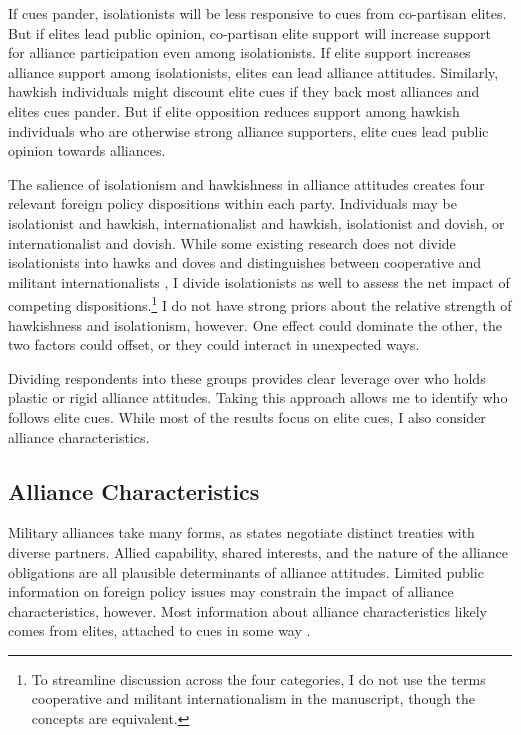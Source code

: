 \documentclass[12pt]{article}
\begin{document}
If cues pander, isolationists will be less responsive to cues from co-partisan elites.
But if elites lead public opinion, co-partisan elite support will increase support for alliance participation even among isolationists. 
If elite support increases alliance support among isolationists, elites can lead alliance attitudes. 
Similarly, hawkish individuals might discount elite cues if they back most alliances and elites cues pander. 
But if elite opposition reduces support among hawkish individuals who are otherwise strong alliance supporters, elite cues lead public opinion towards alliances. 


The salience of isolationism and hawkishness in alliance attitudes creates four relevant foreign policy dispositions within each party. 
Individuals may be isolationist and hawkish, internationalist and hawkish, isolationist and dovish, or internationalist and dovish.
While some existing research does not divide isolationists into hawks and doves and distinguishes between cooperative and militant internationalists \citep{Kertzeretal2014}, I divide isolationists as well to assess the net impact of competing dispositions.\footnote{To streamline discussion across the four categories, I do not use the terms cooperative and militant internationalism in the manuscript, though the concepts are equivalent.}  
I do not have strong priors about the relative strength of hawkishness and isolationism, however.
One effect could dominate the other, the two factors could offset, or they could interact in unexpected ways.


Dividing respondents into these groups provides clear leverage over who holds plastic or rigid alliance attitudes. 
Taking this approach allows me to identify who follows elite cues. 
While most of the results focus on elite cues, I also consider alliance characteristics. 




\subsection{Alliance Characteristics}


Military alliances take many forms, as states negotiate distinct treaties with diverse partners.
Allied capability, shared interests, and the nature of the alliance obligations are all plausible determinants of alliance attitudes.   
Limited public information on foreign policy issues may constrain the impact of alliance characteristics, however. 
Most information about alliance characteristics likely comes from elites, attached to cues in some way \citep{BaumPotter2008}. 
\end{document}
